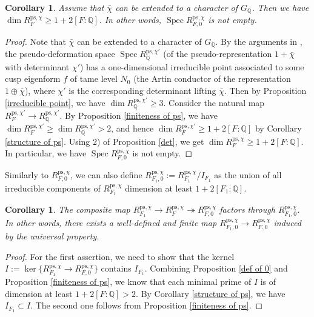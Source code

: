 \documentclass[a4paper, 12pt]{amsart}
\newtheorem{cor}[thm]{Corollary}
\DeclareMathOperator{\Spec}{Spec}
\def\ps{\mathrm{ps}}
\newcommand{\Q}{\mathbb{Q}}
\begin{document}
	\begin{cor}\label{lower}
		Assume that $\bar{\chi}$ can be extended to a character of $G_\Q$. Then we have $\dim R_{F}^{\ps, \chi} \ge 1+2[F:\Q]$. In other words, $\Spec R_{F, 0}^{\ps, \chi}$ is not empty.
	\end{cor}
	
	\begin{proof}
		Note that $\bar{\chi} $ can be extended to a character of $G_{\Q}$. By the arguments in \cite[Lemma 7.3]{Fakhruddin2022}, the pseudo-deformation space $\Spec R_\Q^{\ps, \chi'}$ (of the pseudo-representation $1+\bar{\chi}$ with determinant $\chi'$) has a one-dimensional irreducible point associated to some cusp eigenform $f$ of tame level $N_0$ (the Artin conductor of the representation $1 \oplus \bar{\chi}$), where $\chi'$ is the corresponding determinant lifting $\bar{\chi}$. Then by Proposition \ref{irreducible point}, we have $\dim R_\Q^{\ps, \chi'} \ge 3$. Consider the natural map $ R_{F}^{\ps, \chi'} \to R_\Q^{\ps, \chi'}$. By Proposition \ref{finiteness of ps}, we have $\dim R_{F}^{\ps, \chi'} \ge \dim R_\Q^{\ps, \chi'} >2$, and hence $\dim R_{F}^{\ps, \chi'} \ge 1+2[F:\Q]$ by Corollary \ref{structure of ps}. Using 2) of Proposition \ref{det}, we get $\dim R_{F}^{\ps, \chi} \ge 1+2[F:\Q]$. In particular, we have $\Spec R_{F, 0}^{\ps, \chi}$ is not empty.
	\end{proof}
	
	Similarly to $ R_{F,0}^{\ps, \chi}$, we can also define $ R_{F_1,0}^{\ps, \chi}:= R_{F_1}^{\ps, \chi}/I_{F_1}$ as the union of all irreducible components of $ R_{F_1}^{\ps, \chi}$ dimension at least $1+2[F_1: \Q]$. 
	
	\begin{cor}\label{finite for 0}
		The composite map $ R_{F_1}^{\ps, \chi} \to R_{F}^{\ps, \chi} \twoheadrightarrow R_{F,0}^{\ps, \chi}$ factors through $ R_{F_1,0}^{\ps, \chi}$. In other words,  there exists a well-defined and finite map $ R_{F_1,0}^{\ps, \chi} \to R_{F,0}^{\ps, \chi}$ induced by the universal property.
	\end{cor}
	
	\begin{proof}
		For the first assertion, we need to show that the kernel $I:= \operatorname{ker} \{R_{F_1}^{\ps, \chi} \to R_{F,0}^{\ps, \chi} \}$ contains $I_{F_1} $. Combining Proposition \ref{def of 0} and Proposition \ref{finiteness of ps}, we know that each minimal prime of $I$ is of dimension at least $1+2[F: \Q] >2$. By Corollary \ref{structure of ps}, we have $I_{F_1} \subset I$. The second one follows from Proposition \ref{finiteness of ps}.
	\end{proof}
	
\end{document}
